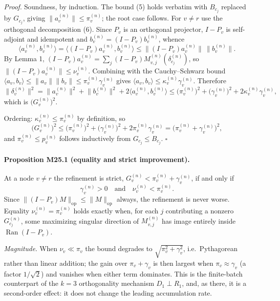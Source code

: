\emph{Proof.} Soundness, by induction. The bound (5) holds verbatim with
$B_{c_j}$ replaced by $G_{c_j}$, giving $\|a_v^{(n)}\|\le\pi_v^{(n)}$; the
root case follows. For $v\ne r$ use the orthogonal decomposition (6). Since
$P_v$ is an orthogonal projector, $I-P_v$ is self-adjoint and idempotent and
$b_v^{(n)}=(I-P_v)b_v^{(n)}$, whence
\[
 \bigl\langle a_v^{(n)},b_v^{(n)}\bigr\rangle
 =\bigl\langle (I-P_v)a_v^{(n)},b_v^{(n)}\bigr\rangle
 \le\bigl\|(I-P_v)a_v^{(n)}\bigr\|\,\bigl\|b_v^{(n)}\bigr\|.
\]
By Lemma 1, $(I-P_v)a_v^{(n)}=\sum_j(I-P_v)M_{v,j}^{(n)}(\delta_{c_j}^{(n)})$,
so $\|(I-P_v)a_v^{(n)}\|\le\nu_v^{(n)}$. Combining with the Cauchy--Schwarz
bound $\langle a_v,b_v\rangle\le\|a_v\|\|b_v\|\le\pi_v^{(n)}\gamma_v^{(n)}$
gives $\langle a_v,b_v\rangle\le\kappa_v^{(n)}\gamma_v^{(n)}$. Therefore
\[
 \bigl\|\delta_v^{(n)}\bigr\|^2
 =\bigl\|a_v^{(n)}\bigr\|^2+\bigl\|b_v^{(n)}\bigr\|^2
  +2\bigl\langle a_v^{(n)},b_v^{(n)}\bigr\rangle
 \le\bigl(\pi_v^{(n)}\bigr)^2+\bigl(\gamma_v^{(n)}\bigr)^2
  +2\kappa_v^{(n)}\gamma_v^{(n)},
\]
which is $\bigl(G_v^{(n)}\bigr)^2$.

Ordering: $\kappa_v^{(n)}\le\pi_v^{(n)}$ by definition, so
\[
 \bigl(G_v^{(n)}\bigr)^2
 \le\bigl(\pi_v^{(n)}\bigr)^2+\bigl(\gamma_v^{(n)}\bigr)^2
   +2\pi_v^{(n)}\gamma_v^{(n)}
 =\bigl(\pi_v^{(n)}+\gamma_v^{(n)}\bigr)^2 ,
\]
and $\pi_v^{(n)}\le p_v^{(n)}$ follows inductively from $G_{c_j}\le B_{c_j}$.
$\square$

\paragraph{Proposition M25.1 (equality and strict improvement).}
At a node $v\ne r$ the refinement is strict, $G_v^{(n)}<\pi_v^{(n)}+\gamma_v^{(n)}$,
if and only if
\[
  \gamma_v^{(n)}>0
  \quad\text{and}\quad
  \nu_v^{(n)}<\pi_v^{(n)} .
\]
Since $\|(I-P_v)M\|_{\mathrm{op}}\le\|M\|_{\mathrm{op}}$ always, the
refinement is never worse. Equality $\nu_v^{(n)}=\pi_v^{(n)}$ holds exactly
when, for each $j$ contributing a nonzero $G_{c_j}^{(n)}$, some maximizing
singular direction of $M_{v,j}^{(n)}$ has image entirely inside
$\operatorname{Ran}(I-P_v)$.

\emph{Magnitude.} When $\nu_v\ll\pi_v$ the bound degrades to
$\sqrt{\pi_v^2+\gamma_v^2}$, i.e.\ Pythagorean rather than linear addition;
the gain over $\pi_v+\gamma_v$ is then largest when $\pi_v\approx\gamma_v$
(a factor $1/\sqrt2$) and vanishes when either term dominates. This is the
finite-batch counterpart of the $k=3$ orthogonality mechanism
$D_1\perp R_1$, and, as there, it is a second-order effect: it does not
change the leading accumulation rate.

